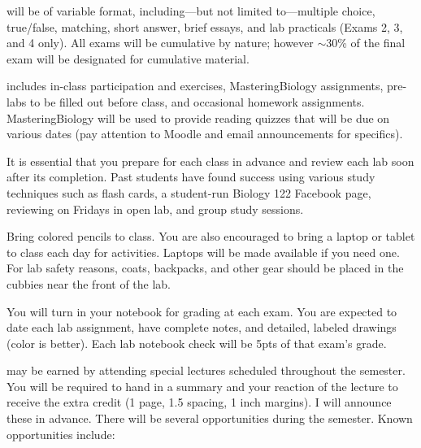 \documentclass{tufte-handout}
\begin{document}
\begin{fullwidth}




 will be of variable format, including---but not limited to---multiple choice, true/false, matching, short answer, brief essays, and lab practicals (Exams 2, 3, and 4 only). All exams will be cumulative by nature; however $\sim$30\% of the final exam will be designated for cumulative material. 

 includes in-class participation and exercises, MasteringBiology assignments, pre-labs to be filled out before class, and occasional homework assignments. MasteringBiology will be used to provide reading quizzes that will be due on various dates (pay attention to Moodle and email announcements for specifics). 

It is essential that you prepare for each class in advance and review each lab soon after its completion. Past students have found success using various study techniques such as flash cards, a student-run Biology 122 Facebook page, reviewing on Fridays in open lab, and group study sessions. 

Bring colored pencils to class. You are also encouraged to bring a laptop or tablet to class each day for activities. Laptops will be made available if you need one. For lab safety reasons, coats, backpacks, and other gear should be placed in the cubbies near the front of the lab. 

 You will turn in your notebook for grading at each exam. You are expected to date each lab assignment, have complete notes, and detailed, labeled drawings (color is better). Each lab notebook check will be 5pts of that exam's grade. 

 may be earned by attending special lectures scheduled throughout the semester.  You will be required to hand in a summary and your reaction of the lecture to receive the extra credit (1 page, 1.5 spacing, 1 inch margins).  I will announce these in advance.  There will be several opportunities during the semester.  Known opportunities include:


\end{fullwidth}
\end{document}
